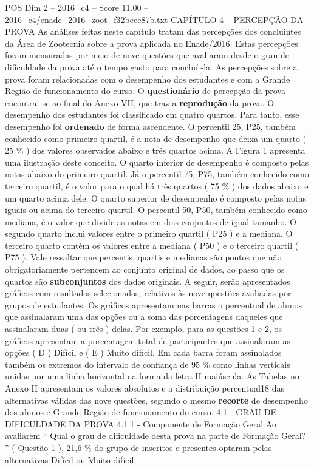 \begin{textsample}{POS Dim 2 – 2016\_c4 – Score 11.00 – 2016\_c4/enade\_2016\_zoot\_f32beec87b.txt}  \label{ex:f2_pos_078}
CAPÍTULO 4 – PERCEPÇÃO DA PROVA As análises feitas neste capítulo tratam das percepções dos concluintes da Área de Zootecnia sobre a prova aplicada no Enade/2016.
Estas percepções foram mensuradas por meio de nove questões que avaliaram desde o grau de dificuldade da prova até o tempo gasto para concluí -la.
As percepções sobre a prova foram relacionadas com o desempenho dos estudantes e com a Grande Região de funcionamento do curso.
O \textbf{questionário} de percepção da prova encontra -se ao final do Anexo VII, que traz a \textbf{reprodução} da prova.
O desempenho dos estudantes foi classificado em quatro quartos.
Para tanto, esse desempenho foi \textbf{ordenado} de forma ascendente.
O percentil 25, P25, também conhecido como primeiro quartil, é a nota de desempenho que deixa um quarto ( 25 \% ) dos valores observados abaixo e três quartos acima.
A Figura 1 apresenta uma ilustração deste conceito.
O quarto inferior de desempenho é composto pelas notas abaixo do primeiro quartil.
Já o percentil 75, P75, também conhecido como terceiro quartil, é o valor para o qual há três quartos ( 75 \% ) dos dados abaixo e um quarto acima dele.
O quarto superior de desempenho é composto pelas notas iguais ou acima do terceiro quartil.
O percentil 50, P50, também conhecido como mediana, é o valor que divide as notas em dois conjuntos de igual tamanho.
O segundo quarto inclui valores entre o primeiro quartil ( P25 ) e a mediana.
O terceiro quarto contém os valores entre a mediana ( P50 ) e o terceiro quartil ( P75 ).
Vale ressaltar que percentis, quartis e medianas são pontos que não obrigatoriamente pertencem ao conjunto original de dados, ao passo que os quartos são \textbf{subconjuntos} dos dados originais.
A seguir, serão apresentados gráficos com resultados selecionados, relativos às nove questões avaliadas por grupos de estudantes.
Os gráficos apresentam nas barras o percentual de alunos que assinalaram uma das opções ou a soma das porcentagens daqueles que assinalaram duas ( ou três ) delas.
Por exemplo, para as questões 1 e 2, os gráficos apresentam a porcentagem total de participantes que assinalaram as opções ( D ) Difícil e ( E ) Muito difícil.
Em cada barra foram assinalados também os extremos do intervalo de confiança de 95 \% como linhas verticais unidas por uma linha horizontal na forma da letra H maiúscula.
As Tabelas no Anexo II apresentam os valores absolutos e a distribuição percentual18 das alternativas válidas das nove questões, segundo o mesmo \textbf{recorte} de desempenho dos alunos e Grande Região de funcionamento do curso. 4.1 - GRAU DE DIFICULDADE DA PROVA 4.1.1 - Componente de Formação Geral Ao avaliarem “ Qual o grau de dificuldade desta prova na parte de Formação Geral? ” ( Questão 1 ), 21,6 \% do grupo de inscritos e presentes optaram pelas alternativas Difícil ou Muito difícil.

\end{textsample}
